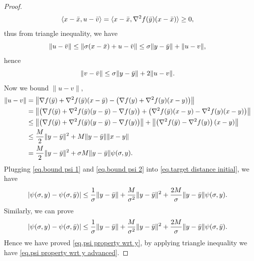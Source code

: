 \documentclass{mcom-l}
\numberwithin{equation}{section}
\begin{document}
\begin{proof}
\begin{equation*}
        \langle x-\Bar{x},u-\Bar{v}\rangle = \langle x-\Bar{x},\nabla ^2 f(\Bar{y})(x-\Bar{x})\rangle\geq 0,
    \end{equation*}
    thus from triangle inequality, we have
    \begin{equation*}
        \|u-\Bar{v}\| \leq \|\sigma(x-\Bar{x})+u-\Bar{v}\| \leq \sigma \|y-\Bar{y}\|+\|u-v\|,
    \end{equation*}
    hence
    \begin{equation}\label{eq.bound psi 1}
        \|v-\Bar{v}\| \leq \sigma\|y-\Bar{y}\| +2\|u-v\|.
    \end{equation}
    Now we bound $\|u-v\|$,
    \begin{equation}\label{eq.bound psi 2}
        \begin{aligned}
            \|u-v\| & = \left\|\nabla f(\Bar{y})+\nabla ^2 f(\Bar{y})(x-\Bar{y})-\left(\nabla f(y) + \nabla ^2 f(y)(x-y)\right)\right\|                                                              \\
                    & = \left\|\left(\nabla f(\Bar{y})+\nabla^2 f(\Bar{y})(y-\Bar{y})-\nabla f(y)\right)+\left(\nabla^2 f(\Bar{y})(x-y)-\nabla^2 f(y)(x-y)\right)\right\|                            \\
                    & \leq \left\|\left(\nabla f(\Bar{y})+\nabla^2 f(\Bar{y})(y-\Bar{y})-\nabla f(y)\right)\right \| +\left \|\left(\nabla^2 f(\Bar{y})-\nabla^2 f(y)\right)\left(x-y\right)\right\| \\
                    & \leq \frac{M}{2}\|y-\Bar{y}\|^2+M\|y-\Bar{y}\|\|x-y\|                                                                                                                          \\
                    & =\frac{M}{2}\|y-\Bar{y}\|^2+\sigma M \|y-\Bar{y}\|\psi(\sigma,y).
        \end{aligned}
    \end{equation}
    Plugging \eqref{eq.bound psi 1} and \eqref{eq.bound psi 2} into \eqref{eq.target distance initial}, we have
    \begin{equation*}
        \left \vert \psi(\sigma,y)-\psi(\sigma,\Bar{y}) \right\vert \leq \frac{1}{\sigma}\|y-\Bar{y}\| +\frac{M}{\sigma^2}\|y-\Bar{y}\|^2 +\frac{2M}{\sigma}\|y-\Bar{y}\|\psi(\sigma,y).
    \end{equation*}
    Similarly, we can prove
    \begin{equation*}
        \left \vert \psi(\sigma,y)-\psi(\sigma,\Bar{y}) \right\vert \leq \frac{1}{\sigma}\|y-\Bar{y}\| +\frac{M}{\sigma^2}\|y-\Bar{y}\|^2 +\frac{2M}{\sigma}\|y-\Bar{y}\|\psi(\sigma,\Bar{y}).
    \end{equation*}
    Hence we have proved \eqref{eq.psi property wrt y}, by applying triangle inequality we have \eqref{eq.psi property wrt y advanced}.
\end{proof}
\end{document}
